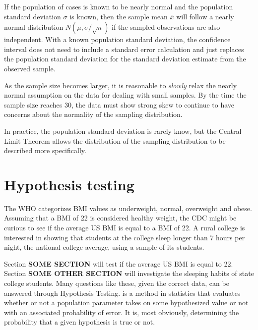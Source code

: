 \begin{termBox}{
If the population of cases is known to be nearly normal and the population standard deviation $\sigma$ is known, then the sample mean $\bar{x}$ will follow a nearly normal distribution $N(\mu, \sigma/\sqrt{n})$ if the sampled observations are also independent. With a known population standard deviation, the confidence interval does not need to include a standard error calculation and just replaces the population standard deviation for the standard deviation estimate from the observed sample.}
\end{termBox}

\begin{tipBox}{
As the sample size becomes larger, it is reasonable to \emph{slowly} relax the nearly normal assumption on the data for dealing with small samples. By the time the sample size reaches 30, the data must show strong skew to continue to have concerns about the normality of the sampling distribution.}
\end{tipBox}

In practice, the population standard deviation is rarely know, but the Central Limit Theorem allows the distribution of the sampling distribution to be described more specifically. 

\section{Hypothesis testing}
\label{hypothesisTesting}


The WHO categorizes BMI values as underweight, normal, overweight and obese. Assuming that a BMI of 22 is considered healthy weight, the CDC might be curious to see if the average US BMI is equal to a BMI of 22. A rural college is interested in showing that students at the college sleep longer than 7 hours per night, the national college average, using a sample of its students. 

Section \textbf{SOME SECTION} will test if the average US BMI is equal to 22. Section \textbf{SOME OTHER SECTION} will investigate the sleeping habits of state college students. Many questions like these, given the correct data, can be answered through Hypothesis Testing.  is a method in statistics that evaluates whether or not a population parameter takes on some hypothesized value or not with an associated probability of error. It is, most obviously, determining the probability that a given hypothesis is true or not.

